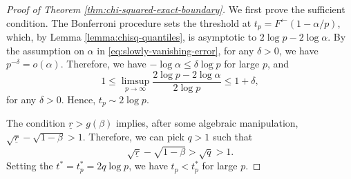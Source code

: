 \begin{proof}[Proof of Theorem \ref{thm:chi-squared-exact-boundary}]
We first prove the sufficient condition.
The Bonferroni procedure sets the threshold at $t_p = F^\leftarrow(1-\alpha/p)$, which, by Lemma \ref{lemma:chisq-quantiles}, is asymptotic to $2\log{p} - 2\log{\alpha}$.
By the assumption on $\alpha$ in \eqref{eq:slowly-vanishing-error}, for any $\delta>0$, we have $p^{-\delta}=o(\alpha)$.
Therefore, we have $-\log\alpha\le\delta\log{p}$ for large $p$, and
\begin{equation} \label{eq:chi-square-sufficient-0}
    1 \le \limsup_{p\to\infty}\frac{2\log{p} - 2\log{\alpha}}{2\log{p}} \le 1+\delta,
\end{equation}
for any $\delta>0$.
Hence, $t_p\sim 2\log{p}$.

The condition $\underline{r} > {{g}}(\beta)$ implies, after some algebraic manipulation,
$\sqrt{\underline{r}} -\sqrt{1-\beta} > 1$.
Therefore, we can pick $q>1$ such that 
\begin{equation} \label{eq:choice-of-q}
    \sqrt{\underline{r}} -\sqrt{1-\beta} > \sqrt{q} > 1.
\end{equation}
Setting the $t^* = t^*_p = 2q\log{p}$, we have $t_p < t^*_p$ for large $p$.


\end{proof}
